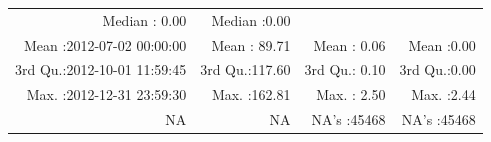 \documentclass[
  10pt,
  a4paper,oneside]{article}
\begin{document}
\begin{longtable}[]{@{}rrrr@{}}
\begin{minipage}[t]{0.18\columnwidth}
Median : 0.00\strut
\end{minipage} & \begin{minipage}[t]{0.18\columnwidth}\raggedleft
Median :0.00\strut
\end{minipage}\tabularnewline
\begin{minipage}[t]{0.34\columnwidth}\raggedleft
Mean :2012-07-02 00:00:00\strut
\end{minipage} & \begin{minipage}[t]{0.19\columnwidth}\raggedleft
Mean : 89.71\strut
\end{minipage} & \begin{minipage}[t]{0.18\columnwidth}\raggedleft
Mean : 0.06\strut
\end{minipage} & \begin{minipage}[t]{0.18\columnwidth}\raggedleft
Mean :0.00\strut
\end{minipage}\tabularnewline
\begin{minipage}[t]{0.34\columnwidth}\raggedleft
3rd Qu.:2012-10-01 11:59:45\strut
\end{minipage} & \begin{minipage}[t]{0.19\columnwidth}\raggedleft
3rd Qu.:117.60\strut
\end{minipage} & \begin{minipage}[t]{0.18\columnwidth}\raggedleft
3rd Qu.: 0.10\strut
\end{minipage} & \begin{minipage}[t]{0.18\columnwidth}\raggedleft
3rd Qu.:0.00\strut
\end{minipage}\tabularnewline
\begin{minipage}[t]{0.34\columnwidth}\raggedleft
Max. :2012-12-31 23:59:30\strut
\end{minipage} & \begin{minipage}[t]{0.19\columnwidth}\raggedleft
Max. :162.81\strut
\end{minipage} & \begin{minipage}[t]{0.18\columnwidth}\raggedleft
Max. : 2.50\strut
\end{minipage} & \begin{minipage}[t]{0.18\columnwidth}\raggedleft
Max. :2.44\strut
\end{minipage}\tabularnewline
\begin{minipage}[t]{0.34\columnwidth}\raggedleft
NA\strut
\end{minipage} & \begin{minipage}[t]{0.19\columnwidth}\raggedleft
NA\strut
\end{minipage} & \begin{minipage}[t]{0.18\columnwidth}\raggedleft
NA's :45468\strut
\end{minipage} & \begin{minipage}[t]{0.18\columnwidth}\raggedleft
NA's :45468\strut
\end{minipage}\tabularnewline
\bottomrule
\end{longtable}
\end{document}
